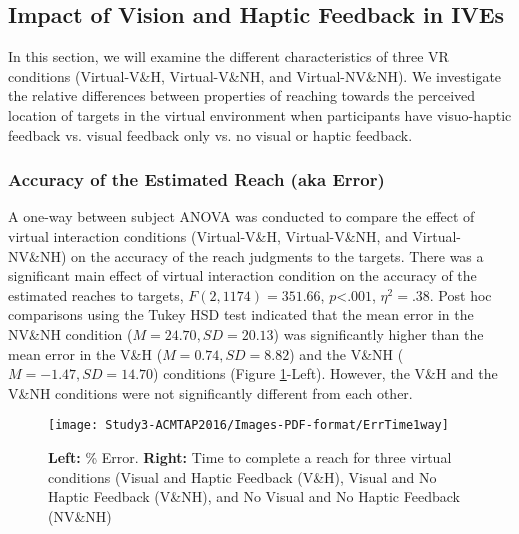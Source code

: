\subsection{Impact of Vision and Haptic Feedback in IVEs} \label{Oneway}
In this section, we will examine the different characteristics of three VR conditions (Virtual-V\&H, Virtual-V\&NH, and Virtual-NV\&NH). We investigate the relative differences between properties of reaching towards the perceived location of targets in the virtual environment when participants have visuo-haptic feedback vs. visual feedback only vs. no visual or haptic feedback.



\subsubsection{Accuracy of the Estimated Reach (aka Error)} \label{accuracy1way}
A one-way between subject ANOVA was conducted to compare the effect of virtual interaction conditions (Virtual-V\&H, Virtual-V\&NH, and Virtual-NV\&NH) on the accuracy of the reach judgments to the targets. There was a significant main effect of virtual interaction condition on the accuracy of the estimated reaches to targets, $F(2,1174)=351.66$, $p$\textless$.001$, $\eta^{2}=.38$. Post hoc comparisons using the Tukey HSD test indicated that the mean error in the NV\&NH condition ($M=24.70, SD=20.13$) was significantly higher than the mean error in the V\&H ($M=0.74, SD=8.82$) and the V\&NH ($M=-1.47, SD=14.70$) conditions (Figure \ref{fig:ErrTime}-Left). However, the V\&H and the V\&NH conditions were not significantly different from each other. 

\begin{figure}
	\centering
	\texttt{[image: Study3-ACMTAP2016/Images-PDF-format/ErrTime1way]}
	\caption{\textsf{\textbf{Left:} \% Error. \textbf{Right:} Time to complete a reach for three virtual conditions (Visual and Haptic Feedback (V\&H), Visual and No Haptic Feedback (V\&NH), and No Visual and No Haptic Feedback (NV\&NH)}}
	\label{fig:ErrTime}
\end{figure} 

